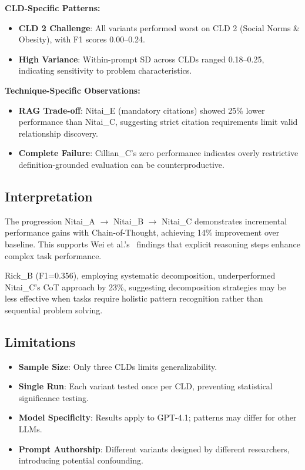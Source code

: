 \textbf{CLD-Specific Patterns:}
\begin{itemize}[noitemsep]
    \item \textbf{CLD 2 Challenge}: All variants performed worst on CLD 2 (Social Norms \& Obesity), with F1 scores 0.00--0.24.
    \item \textbf{High Variance}: Within-prompt SD across CLDs ranged 0.18--0.25, indicating sensitivity to problem characteristics.
\end{itemize}

\textbf{Technique-Specific Observations:}
\begin{itemize}[noitemsep]
    \item \textbf{RAG Trade-off}: Nitai\_E (mandatory citations) showed 25\% lower performance than Nitai\_C, suggesting strict citation requirements limit valid relationship discovery.
    \item \textbf{Complete Failure}: Cillian\_C's zero performance indicates overly restrictive definition-grounded evaluation can be counterproductive.
\end{itemize}

\subsection{Interpretation}

The progression Nitai\_A $\rightarrow$ Nitai\_B $\rightarrow$ Nitai\_C demonstrates incremental performance gains with Chain-of-Thought, achieving 14\% improvement over baseline. This supports Wei et al.'s~\cite{wei2022chain} findings that explicit reasoning steps enhance complex task performance.

Rick\_B (F1=0.356), employing systematic decomposition, underperformed Nitai\_C's CoT approach by 23\%, suggesting decomposition strategies may be less effective when tasks require holistic pattern recognition rather than sequential problem solving.

\subsection{Limitations}

\begin{itemize}[noitemsep]
    \item \textbf{Sample Size}: Only three CLDs limits generalizability.
    \item \textbf{Single Run}: Each variant tested once per CLD, preventing statistical significance testing.
    \item \textbf{Model Specificity}: Results apply to GPT-4.1; patterns may differ for other LLMs.
    \item \textbf{Prompt Authorship}: Different variants designed by different researchers, introducing potential confounding.
\end{itemize}

